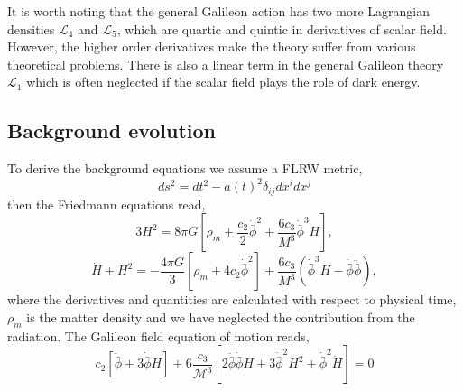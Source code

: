 \documentclass{article}
\def\be{\begin{equation}}
\def\ee{\end{equation}}
\begin{document}
It is worth noting that the general Galileon action has two more Lagrangian densities $\mathcal{L}_4$ and  $\mathcal{L}_5$, which are quartic and quintic in derivatives of scalar field. However, the higher order derivatives make the theory suffer from various theoretical problems. There is also a linear term in the general Galileon theory $\mathcal{L}_1$ which is often neglected if the scalar field plays the role of dark energy.
\subsection{Background evolution}
To derive the background equations we assume a FLRW metric,
\be
ds^2 = dt^2 - a(t)^2 \delta_{ij} dx^i dx^j
\ee
then the Friedmann equations read,
\begin{equation}
3H^2 = 8 \pi G \left[ \rho_m + \frac{c_2}{2} \dot{\bar \phi}^2 + \frac{6 c_3}{M^3}\dot{ \bar\phi}^3 H \right],
\end{equation}
\begin{equation}
\dot{H} + H^2 = -\frac{4 \pi G}{3} \left[ \rho_m + 4c_2\dot{\bar \phi}^2 \right] + \frac{6 c_3}{M^3} \left( \dot{\bar \phi}^3 H - \dot{\bar \phi}\ddot{ \bar\phi} \right),
\end{equation}
where the derivatives and quantities are calculated with respect to physical time, $\rho_m$ is the matter density and we have neglected the contribution from the radiation. The Galileon field equation of motion reads,
\begin{equation}
 c_{2}[\ddot{\bar \phi}+3 \dot{\bar\phi} H] 
 +6 \frac{c_{3}}{\mathcal{M}^{3}}\left[2 \ddot{\bar\phi} \dot{\bar\phi} H+3 \dot{\bar\phi}^{2} H^{2}+\dot{\bar\phi}^{2} \dot{H}\right] = 0
\end{equation}
\end{document}
